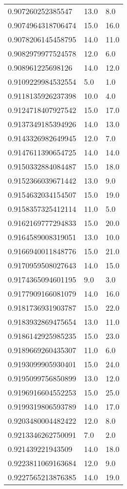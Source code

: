 \begin{center}
\begin{supertabular}[H]{p{0.30\textwidth}p{0.05\textwidth}p{0.05\textwidth}}
0.907260252385547 & 13.0 & 8.0 \\ 
0.9074964318706474 & 15.0 & 16.0 \\ 
0.9078206145458795 & 14.0 & 11.0 \\ 
0.9082979977524578 & 12.0 & 6.0 \\ 
0.908961225698126 & 14.0 & 12.0 \\ 
0.9109229984532554 & 5.0 & 1.0 \\ 
0.9118135926237398 & 10.0 & 4.0 \\ 
0.9124718407927542 & 15.0 & 17.0 \\ 
0.9137349185394926 & 14.0 & 13.0 \\ 
0.9143326982649945 & 12.0 & 7.0 \\ 
0.9147611390654725 & 14.0 & 14.0 \\ 
0.9150332884084487 & 15.0 & 18.0 \\ 
0.9152366039671442 & 13.0 & 9.0 \\ 
0.9154632034154507 & 15.0 & 19.0 \\ 
0.9158357325412114 & 11.0 & 5.0 \\ 
0.9162169777294833 & 15.0 & 20.0 \\ 
0.9164589008319051 & 13.0 & 10.0 \\ 
0.9166940011848776 & 15.0 & 21.0 \\ 
0.9170959508027643 & 14.0 & 15.0 \\ 
0.9174365094601195 & 9.0 & 3.0 \\ 
0.9177909166081079 & 14.0 & 16.0 \\ 
0.9181736931903787 & 15.0 & 22.0 \\ 
0.9183932869475654 & 13.0 & 11.0 \\ 
0.9186142925985235 & 15.0 & 23.0 \\ 
0.9189669260435307 & 11.0 & 6.0 \\ 
0.9193099905930401 & 15.0 & 24.0 \\ 
0.9195099756850899 & 13.0 & 12.0 \\ 
0.9196916604552253 & 15.0 & 25.0 \\ 
0.9199319806593789 & 14.0 & 17.0 \\ 
0.9203480004482422 & 12.0 & 8.0 \\ 
0.9213346262750091 & 7.0 & 2.0 \\ 
0.921439221943509 & 14.0 & 18.0 \\ 
0.9223811069163684 & 12.0 & 9.0 \\ 
0.9227565213876385 & 14.0 & 19.0 \\ 

\end{supertabular}
\end{center}
